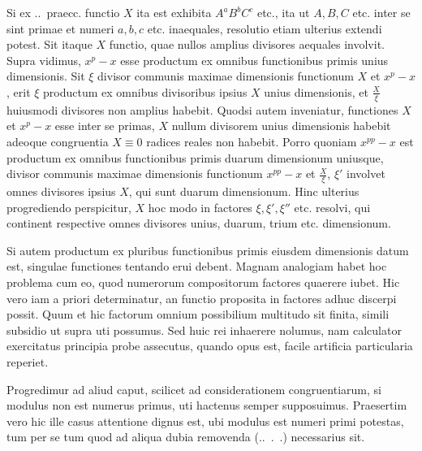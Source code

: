 Si ex \textsection.\textsection.\ praecc. functio $X$ ita est exhibita $A^aB^bC^c$ etc., ita ut $A,B,C$ etc. inter se sint primae et numeri $a,b,c$ etc. inaequales, resolutio etiam ulterius extendi potest. Sit itaque $X$ functio, quae nullos amplius divisores aequales involvit. Supra vidimus, $x^p-x$ esse productum ex omnibus functionibus primis unius dimensionis. Sit $\xi$ divisor communis maximae dimensionis functionum $X$ et $x^p-x$, erit $\xi$ productum ex omnibus divisoribus ipsius $X$ unius dimensionis, et $\frac X\xi$ huiusmodi divisores non amplius habebit. Quodsi autem inveniatur, functiones $X$ et $x^p-x$ esse inter se primas, $X$ nullum divisorem unius dimensionis habebit adeoque congruentia $X\equiv0$ radices reales non habebit. Porro quoniam $x^{pp}-x$ est productum ex omnibus functionibus primis duarum dimensionum uniusque, divisor communis maximae dimensionis functionum $x^{pp}-x$ et $\frac X\xi$, $\xi'$ involvet omnes divisores ipsius $X$, qui sunt duarum dimensionum. Hinc ulterius progrediendo perspicitur, $X$ hoc modo in factores $\xi,\xi',\xi''$ etc. resolvi, qui continent respective omnes divisores unius, duarum, trium etc. dimensionum.

Si autem productum ex pluribus functionibus primis eiusdem dimensionis datum est, singulae functiones tentando erui debent. Magnam analogiam habet hoc problema cum eo, quod numerorum compositorum factores quaerere iubet. Hic vero iam a priori determinatur, an functio proposita in factores adhuc discerpi possit. Quum et hic factorum omnium possibilium multitudo sit finita, simili subsidio ut supra uti possumus. Sed huic rei inhaerere nolumus, nam calculator exercitatus principia probe assecutus, quando opus est, facile artificia particularia reperiet.

Progredimur ad aliud caput, scilicet ad considerationem congruentiarum, si modulus non est numerus primus, uti hactenus semper supposuimus. Praesertim vero hic ille casus attentione dignus est, ubi modulus est numeri primi potestas, tum per se tum quod ad aliqua dubia removenda (\textsection.\textsection.\ .\ .) necessarius sit.
